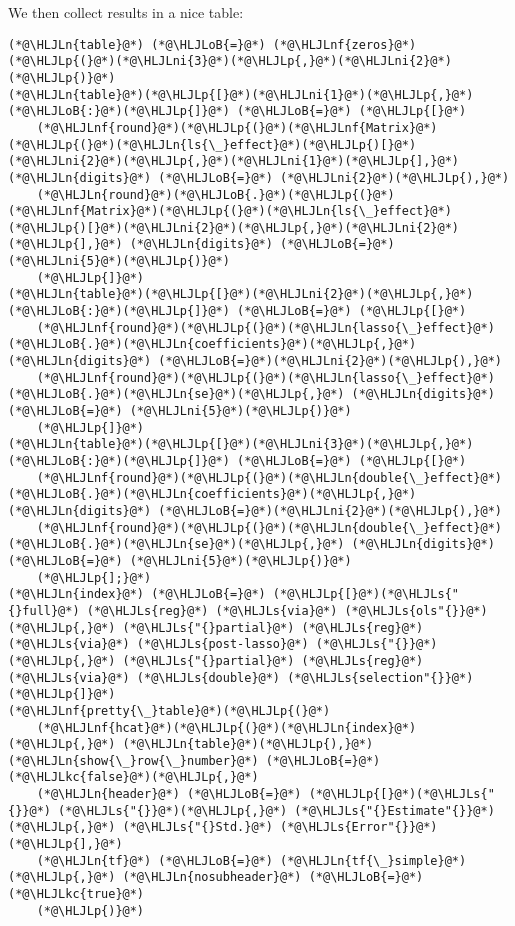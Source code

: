 \documentclass[12pt,a4paper]{article}
\newcommand{\HLJLkc}[1]{\textcolor[RGB]{59,151,46}{\textit{#1}}}
\newcommand{\HLJLn}[1]{#1}
\newcommand{\HLJLnf}[1]{\textcolor[RGB]{66,102,213}{#1}}
\newcommand{\HLJLs}[1]{\textcolor[RGB]{201,61,57}{#1}}
\newcommand{\HLJLni}[1]{\textcolor[RGB]{59,151,46}{#1}}
\newcommand{\HLJLoB}[1]{\textcolor[RGB]{102,102,102}{\textbf{#1}}}
\newcommand{\HLJLp}[1]{#1}
\begin{document}
We then collect results in a nice table:


\begin{lstlisting}
(*@\HLJLn{table}@*) (*@\HLJLoB{=}@*) (*@\HLJLnf{zeros}@*)(*@\HLJLp{(}@*)(*@\HLJLni{3}@*)(*@\HLJLp{,}@*)(*@\HLJLni{2}@*)(*@\HLJLp{)}@*)
(*@\HLJLn{table}@*)(*@\HLJLp{[}@*)(*@\HLJLni{1}@*)(*@\HLJLp{,}@*)(*@\HLJLoB{:}@*)(*@\HLJLp{]}@*) (*@\HLJLoB{=}@*) (*@\HLJLp{[}@*)
    (*@\HLJLnf{round}@*)(*@\HLJLp{(}@*)(*@\HLJLnf{Matrix}@*)(*@\HLJLp{(}@*)(*@\HLJLn{ls{\_}effect}@*)(*@\HLJLp{)[}@*)(*@\HLJLni{2}@*)(*@\HLJLp{,}@*)(*@\HLJLni{1}@*)(*@\HLJLp{],}@*) (*@\HLJLn{digits}@*) (*@\HLJLoB{=}@*) (*@\HLJLni{2}@*)(*@\HLJLp{),}@*) 
    (*@\HLJLn{round}@*)(*@\HLJLoB{.}@*)(*@\HLJLp{(}@*)(*@\HLJLnf{Matrix}@*)(*@\HLJLp{(}@*)(*@\HLJLn{ls{\_}effect}@*)(*@\HLJLp{)[}@*)(*@\HLJLni{2}@*)(*@\HLJLp{,}@*)(*@\HLJLni{2}@*)(*@\HLJLp{],}@*) (*@\HLJLn{digits}@*) (*@\HLJLoB{=}@*) (*@\HLJLni{5}@*)(*@\HLJLp{)}@*)
    (*@\HLJLp{]}@*)
(*@\HLJLn{table}@*)(*@\HLJLp{[}@*)(*@\HLJLni{2}@*)(*@\HLJLp{,}@*)(*@\HLJLoB{:}@*)(*@\HLJLp{]}@*) (*@\HLJLoB{=}@*) (*@\HLJLp{[}@*)
    (*@\HLJLnf{round}@*)(*@\HLJLp{(}@*)(*@\HLJLn{lasso{\_}effect}@*)(*@\HLJLoB{.}@*)(*@\HLJLn{coefficients}@*)(*@\HLJLp{,}@*) (*@\HLJLn{digits}@*) (*@\HLJLoB{=}@*)(*@\HLJLni{2}@*)(*@\HLJLp{),}@*) 
    (*@\HLJLnf{round}@*)(*@\HLJLp{(}@*)(*@\HLJLn{lasso{\_}effect}@*)(*@\HLJLoB{.}@*)(*@\HLJLn{se}@*)(*@\HLJLp{,}@*) (*@\HLJLn{digits}@*) (*@\HLJLoB{=}@*) (*@\HLJLni{5}@*)(*@\HLJLp{)}@*)
    (*@\HLJLp{]}@*)
(*@\HLJLn{table}@*)(*@\HLJLp{[}@*)(*@\HLJLni{3}@*)(*@\HLJLp{,}@*)(*@\HLJLoB{:}@*)(*@\HLJLp{]}@*) (*@\HLJLoB{=}@*) (*@\HLJLp{[}@*)
    (*@\HLJLnf{round}@*)(*@\HLJLp{(}@*)(*@\HLJLn{double{\_}effect}@*)(*@\HLJLoB{.}@*)(*@\HLJLn{coefficients}@*)(*@\HLJLp{,}@*) (*@\HLJLn{digits}@*) (*@\HLJLoB{=}@*)(*@\HLJLni{2}@*)(*@\HLJLp{),}@*) 
    (*@\HLJLnf{round}@*)(*@\HLJLp{(}@*)(*@\HLJLn{double{\_}effect}@*)(*@\HLJLoB{.}@*)(*@\HLJLn{se}@*)(*@\HLJLp{,}@*) (*@\HLJLn{digits}@*) (*@\HLJLoB{=}@*) (*@\HLJLni{5}@*)(*@\HLJLp{)}@*)
    (*@\HLJLp{];}@*)
(*@\HLJLn{index}@*) (*@\HLJLoB{=}@*) (*@\HLJLp{[}@*)(*@\HLJLs{"{}full}@*) (*@\HLJLs{reg}@*) (*@\HLJLs{via}@*) (*@\HLJLs{ols"{}}@*)(*@\HLJLp{,}@*) (*@\HLJLs{"{}partial}@*) (*@\HLJLs{reg}@*)
(*@\HLJLs{via}@*) (*@\HLJLs{post-lasso}@*) (*@\HLJLs{"{}}@*)(*@\HLJLp{,}@*) (*@\HLJLs{"{}partial}@*) (*@\HLJLs{reg}@*) (*@\HLJLs{via}@*) (*@\HLJLs{double}@*) (*@\HLJLs{selection"{}}@*)(*@\HLJLp{]}@*)
(*@\HLJLnf{pretty{\_}table}@*)(*@\HLJLp{(}@*)
    (*@\HLJLnf{hcat}@*)(*@\HLJLp{(}@*)(*@\HLJLn{index}@*)(*@\HLJLp{,}@*) (*@\HLJLn{table}@*)(*@\HLJLp{),}@*) (*@\HLJLn{show{\_}row{\_}number}@*) (*@\HLJLoB{=}@*) (*@\HLJLkc{false}@*)(*@\HLJLp{,}@*) 
    (*@\HLJLn{header}@*) (*@\HLJLoB{=}@*) (*@\HLJLp{[}@*)(*@\HLJLs{"{}}@*) (*@\HLJLs{"{}}@*)(*@\HLJLp{,}@*) (*@\HLJLs{"{}Estimate"{}}@*)(*@\HLJLp{,}@*) (*@\HLJLs{"{}Std.}@*) (*@\HLJLs{Error"{}}@*)(*@\HLJLp{],}@*) 
    (*@\HLJLn{tf}@*) (*@\HLJLoB{=}@*) (*@\HLJLn{tf{\_}simple}@*)(*@\HLJLp{,}@*) (*@\HLJLn{nosubheader}@*) (*@\HLJLoB{=}@*) (*@\HLJLkc{true}@*)
    (*@\HLJLp{)}@*)
\end{lstlisting}
\end{document}
